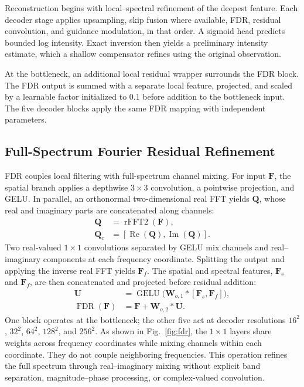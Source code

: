 \documentclass[conference]{IEEEtran}
\newcommand{\vect}[1]{\bm{#1}}
\begin{document}
Reconstruction begins with local--spectral refinement of the deepest feature. Each decoder stage applies upsampling, skip fusion where available, FDR, residual convolution, and guidance modulation, in that order. A sigmoid head predicts bounded log intensity. Exact inversion then yields a preliminary intensity estimate, which a shallow compensator refines using the original observation.

At the bottleneck, an additional local residual wrapper surrounds the FDR block. The FDR output is summed with a separate local feature, projected, and scaled by a learnable factor initialized to 0.1 before addition to the bottleneck input. The five decoder blocks apply the same FDR mapping with independent parameters.

\subsection{Full-Spectrum Fourier Residual Refinement}
FDR couples local filtering with full-spectrum channel mixing. For input \(\vect{F}\), the spatial branch applies a depthwise \(3\times3\) convolution, a pointwise projection, and GELU. In parallel, an orthonormal two-dimensional real FFT yields \(\vect{Q}\), whose real and imaginary parts are concatenated along channels:
\begin{equation}
\begin{aligned}
\vect{Q} &= \operatorname{rFFT2}(\vect{F}),\\
\vect{Q}_{c} &= [\operatorname{Re}(\vect{Q}),
                   \operatorname{Im}(\vect{Q})].
\end{aligned}
\label{eq:fft}
\end{equation}
Two real-valued \(1\times1\) convolutions separated by GELU mix channels and real--imaginary components at each frequency coordinate. Splitting the output and applying the inverse real FFT yields \(\vect{F}_{f}\). The spatial and spectral features, \(\vect{F}_{s}\) and \(\vect{F}_{f}\), are then concatenated and projected before residual addition:
\begin{equation}
\begin{aligned}
\vect{U} &= \operatorname{GELU}
 \bigl(\vect{W}_{o,1} * [\vect{F}_{s},\vect{F}_{f}]\bigr),\\
\operatorname{FDR}(\vect{F})
 &= \vect{F}+\vect{W}_{o,2}*\vect{U}.
\end{aligned}
\label{eq:fdr}
\end{equation}
One block operates at the bottleneck; the other five act at decoder resolutions \(16^2\), \(32^2\), \(64^2\), \(128^2\), and \(256^2\). As shown in Fig.~\ref{fig:fdr}, the \(1\times1\) layers share weights across frequency coordinates while mixing channels within each coordinate. They do not couple neighboring frequencies. This operation refines the full spectrum through real--imaginary mixing without explicit band separation, magnitude--phase processing, or complex-valued convolution.
\end{document}
